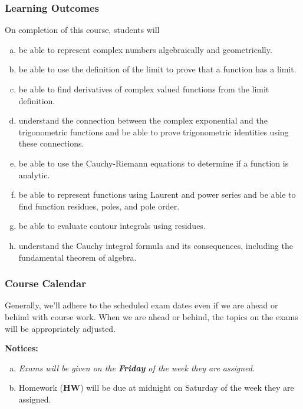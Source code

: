 \documentclass[12pt]{article}
\newcounter{ex}\setcounter{ex}{0}
\newenvironment{alphalist}{
  \begin{enumerate}[(a)]
    \addtolength{\itemsep}{-0.75\itemsep}}
  {\end{enumerate}}
\begin{document}
\subsubsection*{Learning Outcomes}
On completion of this course, students will 
\begin{alphalist}
    \item be able to represent complex numbers algebraically and geometrically.
    \item be able to use the definition of the limit to prove that a function has a limit.
    \item be able to find derivatives of complex valued functions from the limit definition.
    \item understand the connection between the complex exponential and the trigonometric functions and be able to 
        prove trigonometric identities using these connections.
    \item be able to use the Cauchy-Riemann equations to determine if a function is 
          analytic.
    \item be able to represent functions using Laurent and power series and be able 
           to find function residues, poles, and pole order.
    \item be able to evaluate contour integrals using residues.
    \item understand the Cauchy integral formula and its consequences,  including the 
       fundamental theorem of algebra.
\end{alphalist}

\subsubsection*{Course Calendar}

Generally, we'll adhere to the scheduled exam dates even if we are ahead or behind with course work.  
When we are ahead or behind, the topics on the exams will be appropriately adjusted.  


\vspace{0.1in}
\noindent \textbf{Notices:}


\begin{alphalist}
   \item \emph{Exams will be given on the \textbf{Friday} of the week they are assigned.}
   

    \item Homework (\textbf{HW}) will be due at midnight on  Saturday of the week they are assigned.  


\end{alphalist}
\end{document}
